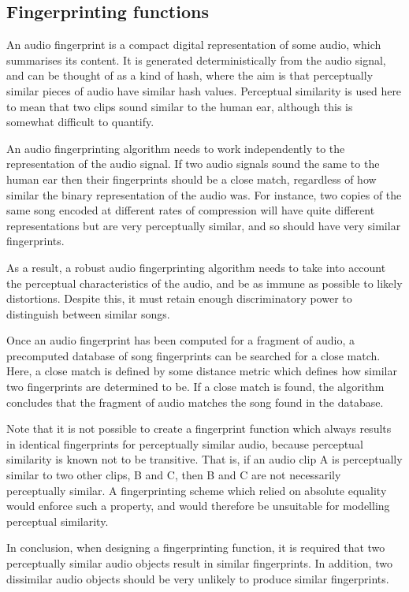 \documentclass[12pt,a4paper,twoside,openright]{report}
\begin{document}
\subsection{Fingerprinting functions}

An audio fingerprint is a compact digital representation of some audio, which summarises its content. It is generated deterministically from the audio signal, and can be thought of as a kind of hash, where the aim is that perceptually similar pieces of audio have similar hash values. Perceptual similarity is used here to mean that two clips sound similar to the human ear, although this is somewhat difficult to quantify.

An audio fingerprinting algorithm needs to work independently to the representation of the audio signal. If two audio signals sound the same to the human ear then their fingerprints should be a close match, regardless of how similar the binary representation of the audio was. For instance, two copies of the same song encoded at different rates of compression will have quite different representations but are very perceptually similar, and so should have very similar fingerprints.

As a result, a robust audio fingerprinting algorithm needs to take into account the perceptual characteristics of the audio, and be as immune as possible to likely distortions. Despite this, it must retain enough discriminatory power to distinguish between similar songs.

Once an audio fingerprint has been computed for a fragment of audio, a precomputed database of song fingerprints can be searched for a close match. Here, a close match is defined by some distance metric which defines how similar two fingerprints are determined to be. If a close match is found, the algorithm concludes that the fragment of audio matches the song found in the database.

Note that it is not possible to create a fingerprint function which always results in identical fingerprints for perceptually similar audio, because perceptual similarity is known not to be transitive. That is, if an audio clip A is perceptually similar to two other clips, B and C, then B and C are not necessarily perceptually similar. A fingerprinting scheme which relied on absolute equality would enforce such a property, and would therefore be unsuitable for modelling perceptual similarity.

In conclusion, when designing a fingerprinting function, it is required that two perceptually similar audio objects result in similar fingerprints. In addition, two dissimilar audio objects should be very unlikely to produce similar fingerprints. 
\end{document}
